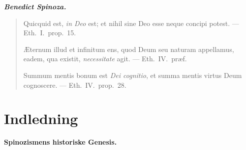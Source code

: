 \documentclass[12pt,a4paper]{book}
\newcommand{\opage}[1]{\marginnote{\footnotesize\textit{[#1]}}}
\begin{document}
\begin{center}
{\Large\textbf{\emph{Benedict Spinoza.}}}
\end{center}

\vspace{2\baselineskip}

\begingroup
{}
\begin{quote}
\small
Quicquid est, \emph{in Deo} est; et nihil sine Deo esse neque concipi
potest. --- Eth.\ I.\ prop.\ 15.

\medskip

Æternum illud et infinitum ens, quod Deum seu naturam appellamus, eadem,
qua existit, \emph{necessitate} agit. --- Eth.\ IV.\ præf.

\medskip

Summum mentis bonum est \emph{Dei cognitio}, et summa mentis virtus Deum
cognoscere. --- Eth.\ IV.\ prop.\ 28.
\end{quote}
\endgroup

\opage{16} %

\newpage

\chapter*{Indledning}

\begin{center}
\textbf{Spinozismens historiske Genesis.}
\end{center}
\end{document}
